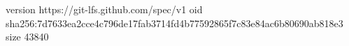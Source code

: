 version https://git-lfs.github.com/spec/v1
oid sha256:7d7633ea2cce4c796de17fab3714fd4b77592865f7c83e84ac6b80690ab818e3
size 43840
